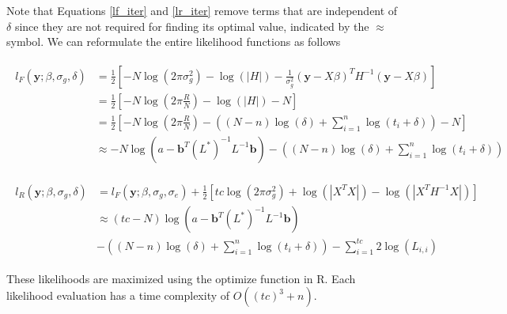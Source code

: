         Note that Equations \ref{lf_iter} and \ref{lr_iter} remove terms that are independent of $\delta$ since they are not required for finding its optimal value, indicated by the $\approx$ symbol. We can reformulate the entire likelihood functions as follows
        
        \begin{align}
        \begin{split}
            l_F(\mathbf{y}; \beta, \sigma_g, \delta) & = \frac{1}{2}\left[-N\log{(2\pi\sigma^2_g)} - \log(|H|) - \frac{1}{\sigma^2_g}(\mathbf{y}-X\beta)^T H^{-1} (\mathbf{y}-X\beta)\right] \\ 
                                                     & = \frac{1}{2}\left[-N\log{(2\pi\frac{R}{N})} - \log(|H|) - N\right] \\
                                                     & = \frac{1}{2}\left[-N\log{(2\pi\frac{R}{N})} - \left((N-n)\log{(\delta)} + \sum_{i=1}^n \log{(t_i + \delta)}\right) - N\right] \\
                                                     & \approx -N\log{(a - \mathbf{b}^T(L^*)^{-1}L^{-1}\mathbf{b})} - \left((N-n)\log{(\delta)} + \sum_{i=1}^n \log{(t_i + \delta)}\right) \label{lf_iter} 
        \end{split}
        \end{align}
        
        \begin{align}
        \begin{split}
            l_R(\mathbf{y}; \beta, \sigma_g, \delta) & = l_F(\mathbf{y}; \beta, \sigma_g, \sigma_e) + \frac{1}{2}\left[tc\log(2\pi\sigma^2_g) + \log{(|X^TX|)} - \log{(|X^TH^{-1}X|)}\right] \\
                                                     & \approx (tc-N)\log{(a - \mathbf{b}^T(L^*)^{-1}L^{-1}\mathbf{b})} \\
                                                     & -\left((N-n)\log{(\delta)} + \sum_{i=1}^n \log{(t_i + \delta)}\right) - \sum_{i=1}^{tc} 2\log(L_{i,i}) \label{lr_iter} 
        \end{split}
        \end{align}
        
    These likelihoods are maximized using the optimize function in R. Each likelihood evaluation has a time complexity of $O((tc)^3 + n)$.

